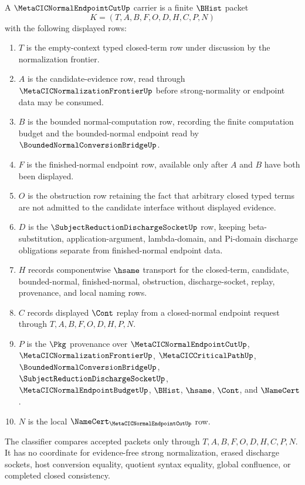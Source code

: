 \begin{definition}
\label{def:metacic-normal-endpoint-cut-carrier}
A $\MetaCICNormalEndpointCutUp$ carrier is a finite $\BHist$ packet
$$
K=(T,A,B,F,O,D,H,C,P,N)
$$
with the following displayed rows:
\begin{enumerate}
\item $T$ is the empty-context typed closed-term row under discussion by the normalization frontier.
\item $A$ is the candidate-evidence row, read through $\MetaCICNormalizationFrontierUp$ before strong-normality or endpoint data may be consumed.
\item $B$ is the bounded normal-computation row, recording the finite computation budget and the bounded-normal endpoint read by $\BoundedNormalConversionBridgeUp$.
\item $F$ is the finished-normal endpoint row, available only after $A$ and $B$ have both been displayed.
\item $O$ is the obstruction row retaining the fact that arbitrary closed typed terms are not admitted to the candidate interface without displayed evidence.
\item $D$ is the $\SubjectReductionDischargeSocketUp$ row, keeping beta-substitution, application-argument, lambda-domain, and Pi-domain discharge obligations separate from finished-normal endpoint data.
\item $H$ records componentwise $\hsame$ transport for the closed-term, candidate, bounded-normal, finished-normal, obstruction, discharge-socket, replay, provenance, and local naming rows.
\item $C$ records displayed $\Cont$ replay from a closed-normal endpoint request through $T,A,B,F,O,D,H,P,N$.
\item $P$ is the $\Pkg$ provenance over $\MetaCICNormalEndpointCutUp$, $\MetaCICNormalizationFrontierUp$, $\MetaCICCriticalPathUp$, $\BoundedNormalConversionBridgeUp$, $\SubjectReductionDischargeSocketUp$, $\MetaCICNormalEndpointBudgetUp$, $\BHist$, $\hsame$, $\Cont$, and $\NameCert$.
\item $N$ is the local $\NameCert_{\MetaCICNormalEndpointCutUp}$ row.
\end{enumerate}
The classifier compares accepted packets only through $T,A,B,F,O,D,H,C,P,N$. It has no coordinate for evidence-free strong normalization, erased discharge sockets, host conversion equality, quotient syntax equality, global confluence, or completed closed consistency.
\end{definition}

